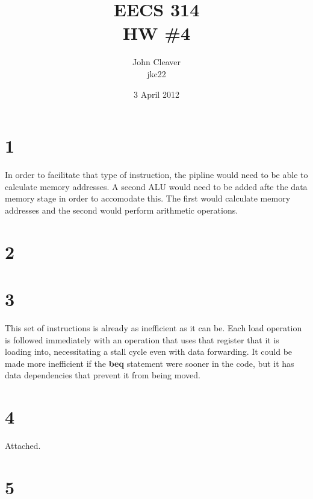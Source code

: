 \documentclass{article}
\title{EECS 314 \\ HW \#4}
\author{John Cleaver \\ jkc22}
\date{3 April 2012}
\begin{document}
\maketitle

\section*{1}

In order to facilitate that type of instruction, the pipline would need to be able to calculate memory addresses. A second ALU would need to be added afte the data memory stage in order to accomodate this. The first would calculate memory addresses and the second would perform arithmetic operations.

\section*{2}
\section*{3}

This set of instructions is already as inefficient as it can be. Each load operation is followed immediately with an operation that uses that register that it is loading into, necessitating a stall cycle even with data forwarding. It could be made more inefficient if the {\bf beq} statement were sooner in the code, but it has data dependencies that prevent it from being moved.

\section*{4}

Attached.

\pagebreak
\section*{5}
\end{document}
